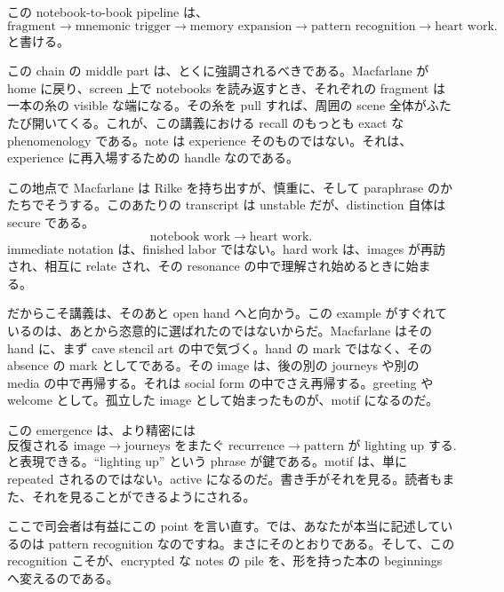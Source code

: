 この notebook-to-book pipeline は、
\begin{equation}
\text{fragment} \longrightarrow \text{mnemonic trigger} \longrightarrow \text{memory expansion} \longrightarrow \text{pattern recognition} \longrightarrow \text{heart work}.
\end{equation}
と書ける。

この chain の middle part は、とくに強調されるべきである。Macfarlane が home に戻り、screen 上で notebooks を読み返すとき、それぞれの fragment は一本の糸の visible な端になる。その糸を pull すれば、周囲の scene 全体がふたたび開いてくる。これが、この講義における recall のもっとも exact な phenomenology である。note は experience そのものではない。それは、experience に再入場するための handle なのである。

この地点で Macfarlane は Rilke を持ち出すが、慎重に、そして paraphrase のかたちでそうする。このあたりの transcript は unstable だが、distinction 自体は secure である。
\begin{equation}
\text{notebook work} \longrightarrow \text{heart work}.
\end{equation}
immediate notation は、finished labor ではない。hard work は、images が再訪され、相互に relate され、その resonance の中で理解され始めるときに始まる。

だからこそ講義は、そのあと open hand へと向かう。この example がすぐれているのは、あとから恣意的に選ばれたのではないからだ。Macfarlane はその hand に、まず cave stencil art の中で気づく。hand の mark ではなく、その absence の mark としてである。その image は、後の別の journeys や別の media の中で再帰する。それは social form の中でさえ再帰する。greeting や welcome として。孤立した image として始まったものが、motif になるのだ。

この emergence は、より精密には
\begin{equation}
\text{反復される image} \longrightarrow \text{journeys をまたぐ recurrence} \longrightarrow \text{pattern が lighting up する}.
\end{equation}
と表現できる。``lighting up'' という phrase が鍵である。motif は、単に repeated されるのではない。active になるのだ。書き手がそれを見る。読者もまた、それを見ることができるようにされる。

ここで司会者は有益にこの point を言い直す。では、あなたが本当に記述しているのは pattern recognition なのですね。まさにそのとおりである。そして、この recognition こそが、encrypted な notes の pile を、形を持った本の beginnings へ変えるのである。

